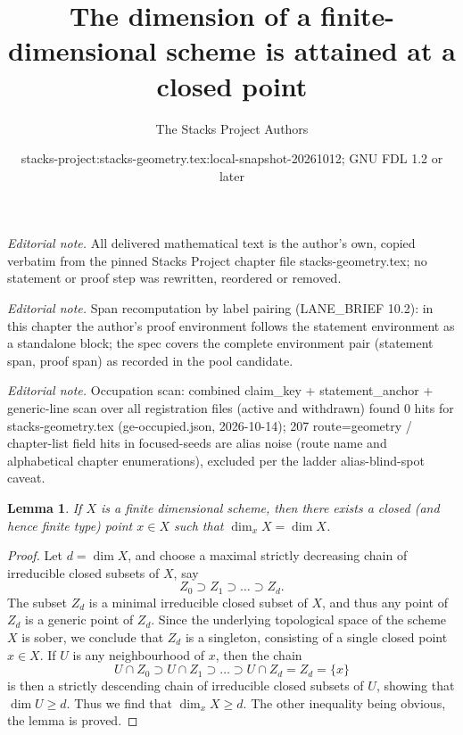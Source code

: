 \documentclass[10pt,a4paper]{amsart}
\title{The dimension of a finite-dimensional scheme is attained at a closed point}
\author{The Stacks Project Authors}
\date{stacks-project:stacks-geometry.tex:local-snapshot-20261012; GNU FDL 1.2 or later}
\theoremstyle{plain}
\newtheorem{lemma}[subsection]{Lemma}
\theoremstyle{definition}
\theoremstyle{remark}
\numberwithin{equation}{subsection}
\begin{document}
\maketitle
\noindent\textit{Editorial note.} All delivered mathematical text is the author's own, copied verbatim from the pinned Stacks Project chapter file stacks-geometry.tex; no statement or proof step was rewritten, reordered or removed.\par\medskip
\noindent\textit{Editorial note.} Span recomputation by label pairing (LANE\_BRIEF 10.2): in this chapter the author's proof environment follows the statement environment as a standalone block; the spec covers the complete environment pair (statement span, proof span) as recorded in the pool candidate.\par\medskip
\noindent\textit{Editorial note.} Occupation scan: combined claim\_key + statement\_anchor + generic-line scan over all registration files (active and withdrawn) found 0 hits for stacks-geometry.tex (ge-occupied.json, 2026-10-14); 207 route=geometry / chapter-list field hits in focused-seeds are alias noise (route name and alphabetical chapter enumerations), excluded per the ladder alias-blind-spot caveat.\par\medskip
\begin{lemma}
\label{lemma-dimension-achieved-by-finite-type-point}
If $X$ is a finite dimensional scheme,
then there exists a closed (and hence finite type) point $x \in X$
such that $\dim_x X = \dim X$.
\end{lemma}

\begin{proof}
Let $d = \dim X$,
and choose a maximal strictly decreasing
chain of irreducible closed subsets of $X$,
say
\begin{equation}
\label{equation-maximal-chain}
Z_0 \supset Z_1 \supset \ldots \supset Z_d.
\end{equation}
The subset $Z_d$ is a minimal irreducible closed subset of $X$,
and thus any point of $Z_d$ is a generic point of $Z_d$.
Since the underlying topological space of the scheme $X$ is sober,
we conclude that $Z_d$ is a singleton, consisting of a single
closed point $x \in X$.
If $U$ is
any neighbourhood of $x$, then
the chain
$$
U\cap Z_0 \supset U\cap Z_1 \supset \ldots \supset U\cap Z_d = Z_d =
\{x\}
$$
is then a strictly descending chain of irreducible
closed subsets of $U$, showing that $\dim U \geq d$.
Thus we find that $\dim_x X \geq d$.  The other inequality
being obvious, the lemma is proved.
\end{proof}
\end{document}
